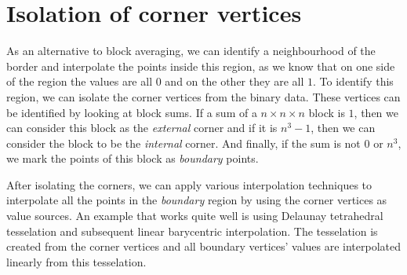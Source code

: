 \documentclass[a4paper,10pt]{report}
\begin{document}
\section{Isolation of corner vertices}
As an alternative to block averaging, we can identify a neighbourhood of the border and interpolate the points inside this region, as we know that on one side of the region the values are all $0$ and on the other they are all $1$. To identify this region, we can isolate the corner vertices from the binary data. These vertices can be identified by looking at block sums. If a sum of a $n\times n \times n$ block is $1$, then we can consider this block as the \textit{external} corner and if it is $n^3-1$, then we can consider the block to be the \textit{internal} corner. And finally, if the sum is not $0$ or $n^3$, we mark the points of this block as \textit{boundary} points.

After isolating the corners, we can apply various interpolation techniques to interpolate all the points in the \textit{boundary} region by using the corner vertices as value sources. An example that works quite well is using Delaunay tetrahedral tesselation and subsequent linear barycentric interpolation. The tesselation is created from the corner vertices and all boundary vertices' values are interpolated linearly from this tesselation.
\end{document}
